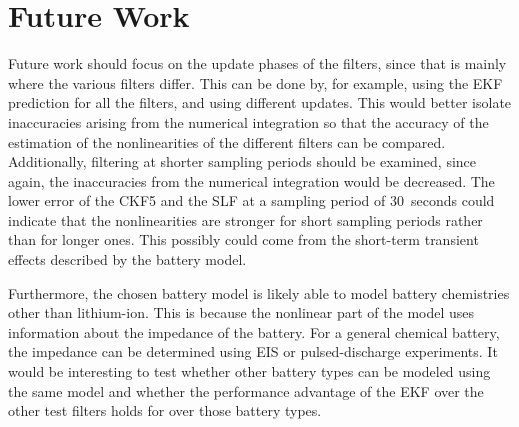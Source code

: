 \documentclass[../zhang_thesis.tex]{subfiles}
\begin{document}
\section{Future Work}

Future work should focus on the update phases of the filters, since that is mainly where the various filters differ. This can be done by, for example, using the EKF prediction for all the filters, and using different updates. This would better isolate inaccuracies arising from the numerical integration so that the accuracy of the estimation of the nonlinearities of the different filters can be compared. Additionally, filtering at shorter sampling periods should be examined,
since again, the inaccuracies from the numerical integration would be decreased. The lower error of the CKF5 and the SLF at a sampling period of 30~seconds could indicate that the nonlinearities are stronger for short sampling periods rather than for longer ones. This possibly could come from the short-term transient effects described by the battery model.

Furthermore, the chosen battery model is likely able to model battery chemistries other than lithium-ion. This is because the nonlinear part of the model uses information about the impedance of the battery. For a general chemical battery, the impedance can be determined using EIS or pulsed-discharge experiments. It would be interesting to test whether other battery types can be modeled using the same model and whether the performance advantage of the EKF over the other test filters holds for over those battery types.
\end{document}
